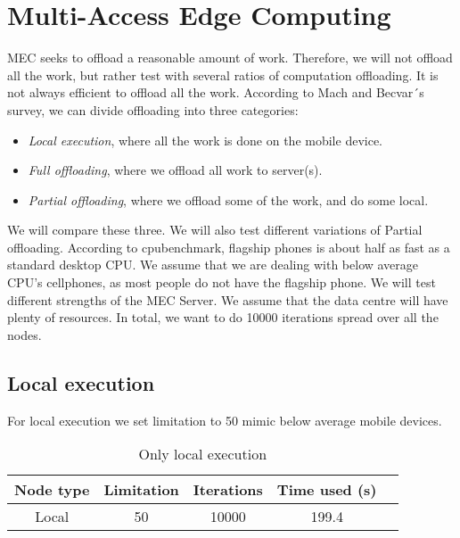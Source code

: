 \section{Multi-Access Edge Computing}
MEC seeks to offload a reasonable amount of work. Therefore, we will not offload all the work, but rather test with several ratios of computation offloading. It is not always efficient to offload all the work. According to Mach and Becvar´s survey\cite{mach_mobile_2017}, we can divide offloading into three categories:
\begin{itemize}
    \item \textit{Local execution}, where all the work is done on the mobile device.
    \item \textit{Full offloading}, where we offload all work to server(s).
    \item \textit{Partial offloading}, where we offload some of the work, and do some local.
\end{itemize}
We will compare these three. We will also test different variations of Partial offloading. According to cpubenchmark\cite{noauthor_passmark_nodate}, flagship phones is about half as fast as a standard desktop CPU. We assume that we are dealing with below average CPU's cellphones, as most people do not have the flagship phone. We will test different strengths of the MEC Server. We assume that the data centre will have plenty of resources. In total, we want to do 10000 iterations spread over all the nodes.

\subsection{Local execution}
For local execution we set limitation to 50 mimic below average mobile devices.

\begin{table}[h!]
    \centering
    \begin{tabular}[c]{|c|c|c|c|c|}
        \hline
        Node type & Limitation & Iterations & Time used (s) \\
        \hline
        \hline
        Local & 50 & 10000 & 199.4 \\
        \hline
    \end{tabular}
    \caption{Only local execution}
    \label{tab:MEC_local_execution}
\end{table}



